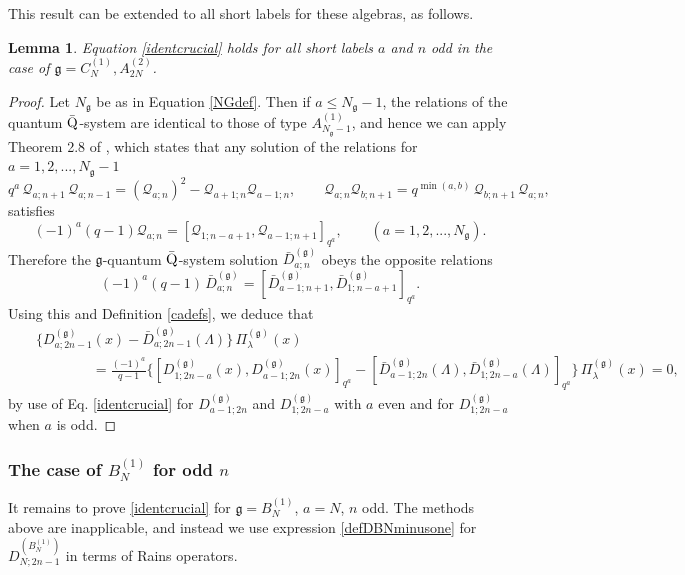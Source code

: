 \documentclass[12pt]{amsart}
\newtheorem{lemma}[thm]{Lemma}
\newcommand{\barQ}{$\bar{\rm Q}$}
\newcommand{\barD}{\bar D}
\newcommand{\cQ}{\mathcal Q}
\newcommand{\g}{{\mathfrak{g}}}
\newcommand{\lL}{{\Lambda}}
\numberwithin{equation}{section}
\begin{document}
This result can be extended to all short labels for these algebras, as follows.
%
\begin{lemma}\label{shortoddthm}
Equation \eqref{identcrucial} holds for all short labels $a$ and $n$ odd in the case of  $\g=C_N^{(1)},A_{2N}^{(2)}$.
%
%
%
%
%
%
%
\end{lemma}
\begin{proof}
Let $N_\g$ be as in Equation \eqref{NGdef}. Then
if $a\leq N_\g-1$, the relations of the quantum \barQ-system are identical to those of type $A_{N_\g-1}^{(1)}$, and hence we can apply
Theorem 2.8 of \cite{DFK16},  which states that any solution of the relations for $a=1,2,...,N_\g-1$
%
%
%
$$ q^a\,\cQ_{a;n+1}\,\cQ_{a;n-1}=(\cQ_{a;n})^2-\cQ_{a+1;n}\cQ_{a-1;n},\qquad \cQ_{a;n}\cQ_{b;n+1}=q^{{\min}(a,b)}\,\cQ_{b;n+1}\,\cQ_{a;n},$$
satisfies 
$$(-1)^a (q-1) \cQ_{a;n}=[\cQ_{1;n-a+1},\cQ_{a-1;n+1}]_{q^a},\qquad (a=1,2,...,N_\g). $$
%
Therefore the $\g$-quantum \barQ-system solution $\barD_{a;n}^{(\g)}$ obeys the opposite relations
$$(-1)^a (q-1) \,\barD_{a;n}^{(\g)}=[\barD_{a-1;n+1}^{(\g)},\barD_{1;n-a+1}^{(\g)}]_{q^a}.$$
Using this and Definition \ref{cadefs},
%
%
we deduce that
\begin{eqnarray*}&&\{D_{a;2n-1}^{(\g)}(x)-\barD_{a;2n-1}^{(\g)}(\lL)\}\, \Pi_\lambda^{(\g)}(x)\\
&&\qquad\qquad = \frac{(-1)^a}{q-1} \{[D_{1;2n-a}^{(\g)}(x),D_{a-1;2n}^{(\g)}(x)]_{q^a}-[\barD_{a-1;2n}^{(\g)}(\lL),\barD_{1;2n-a}^{(\g)}(\lL)]_{q^a}\}\,\Pi_\lambda^{(\g)}(x)=0,
\end{eqnarray*}
by use of Eq. \eqref{identcrucial} for $D_{a-1;2n}^{(\g)}$ and $D_{1;2n-a}^{(\g)}$ with $a$ even 
and for
$D_{1;2n-a}^{(\g)}$ when $a$ is odd. 
\end{proof}




\subsubsection{The case of $B_N^{(1)}$ for odd $n$}
\label{bnproofsec}
%
%
%
%
%
It remains to prove \eqref{identcrucial} 
for $\g=B_N^{(1)}$, $a=N$, $n$ odd. The methods above are inapplicable, and instead we use expression \eqref{defDBNminusone} for $D_{N;2n-1}^{(B_N^{(1)})}$ in terms of Rains operators. 
\end{document}

